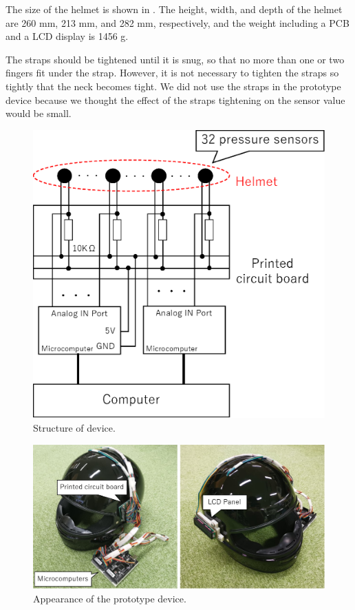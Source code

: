 \documentclass[english,preprint,JIP]{ipsj}
\begin{document}
The size of the helmet is shown in . The height, width, and depth of the helmet are 260 mm, 213 mm, and 282 mm, respectively, and the weight including a PCB and a LCD display is 1456 g.

The straps should be tightened until it is snug, so that no more than one or two fingers fit under the strap.\cite{strap} However, it is not necessary to tighten the straps so tightly that the neck becomes tight. We did not use the straps in the prototype device because we thought the effect of the straps tightening on the sensor value would be small.

\begin{figure}[!t]
  \begin{center}
    \includegraphics[width=0.6\linewidth]{figure/device.eps}
  \end{center}
  \caption{Structure of device.}
  \label{fig:device}
\end{figure}

\begin{figure}[!t]
  \centering
    \includegraphics[width=0.9\linewidth]{figure/met_over.eps}
  \caption{Appearance of the prototype device.}
  \label{fig:met_over}
\end{figure}
\end{document}
